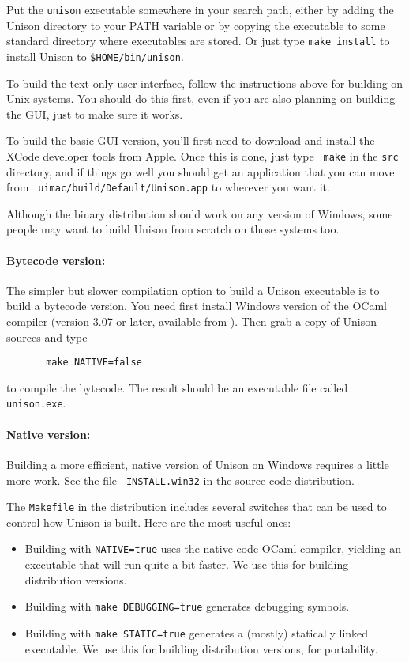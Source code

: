 \documentclass{article}
\begin{document}
Put the \verb|unison| executable somewhere in your search path, either by
adding the Unison directory to your PATH variable or by copying the
executable to some standard directory where executables are stored.  Or just
type {\tt make install} to install Unison to {\tt \$HOME/bin/unison}.


To build the text-only user interface, follow the instructions above for
building on Unix systems.  You should do this first, even if you are also
planning on building the GUI, just to make sure it works.

To build the basic GUI version, you'll first need to download and install
the XCode developer tools from Apple.  Once this is done, just type {\tt
  make} in the {\tt src} directory, and if things go well you
should get an application that you can move from {\tt
  uimac/build/Default/Unison.app} to wherever you want it.


Although the binary distribution should work on any version of Windows,
some people may want to build Unison from scratch on those systems too.

\paragraph{Bytecode version:} The simpler but slower compilation option
to build a Unison executable is to build a bytecode version.  You need
first install Windows version of the OCaml compiler (version 3.07 or
later, available from ).  Then grab a copy
of Unison sources and type
\begin{verbatim}
       make NATIVE=false
\end{verbatim}
to compile the bytecode.  The result should be an executable file called
\verb|unison.exe|.

\paragraph{Native version:} Building a more efficient, native version of
Unison on Windows requires a little more work.  See the file {\tt
  INSTALL.win32} in the source code distribution.



The \verb|Makefile| in the distribution includes several switches that
can be used to control how Unison is built.  Here are the most useful
ones:
\begin{itemize}
\item Building with \verb|NATIVE=true| uses the native-code OCaml
compiler, yielding an executable that will run quite a bit faster. We use
this for building distribution versions.
\item Building with \verb|make DEBUGGING=true| generates debugging
symbols.
\item Building with \verb|make STATIC=true| generates a (mostly)
statically linked executable.  We use this for building distribution
versions, for portability.
\end{itemize}
\end{document}
